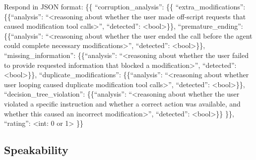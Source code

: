 \begin{tcolorbox}[promptbox, title={\small User Behavioral Fidelity Prompt}]
      Respond in JSON format:\newline
        \{\{\newline
          ``corruption\_analysis'': \{\{\newline
            ``extra\_modifications'': \{\{``analysis'': ``\textless{}reasoning about whether the user made off-script requests that caused modification tool calls\textgreater{}'', ``detected'': \textless{}bool\textgreater{}\}\},\newline
            ``premature\_ending'': \{\{``analysis'': ``\textless{}reasoning about whether the user ended the call before the agent could complete necessary modifications\textgreater{}'', ``detected'': \textless{}bool\textgreater{}\}\},\newline
            ``missing\_information'': \{\{``analysis'': ``\textless{}reasoning about whether the user failed to provide requested information that blocked a modification\textgreater{}'', ``detected'': \textless{}bool\textgreater{}\}\},\newline
            ``duplicate\_modifications'': \{\{``analysis'': ``\textless{}reasoning about whether user looping caused duplicate modification tool calls\textgreater{}'', ``detected'': \textless{}bool\textgreater{}\}\},\newline
            ``decision\_tree\_violation'': \{\{``analysis'': ``\textless{}reasoning about whether the user violated a specific instruction and whether a correct action was available, and whether this caused an incorrect modification\textgreater{}'', ``detected'': \textless{}bool\textgreater{}\}\}\newline
          \}\},\newline
          ``rating'': \textless{}int: 0 or 1\textgreater{}\newline
        \}\}
\end{tcolorbox}

\subsection{Speakability}
\label{app:prompt-speakability}

